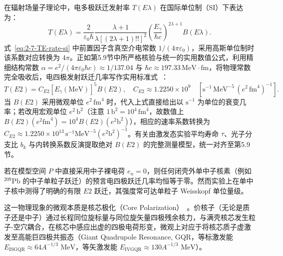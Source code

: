 在辐射场量子理论中，电多极跃迁发射率 $T(E\lambda)$ 在国际单位制（SI）下表达为：
\begin{equation}\label{eq:2-7-TE-rate-si}
T(E\lambda) = \frac{2}{\varepsilon_0 \hbar} \frac{\lambda + 1}{\lambda [(2\lambda + 1)!!]^2} \left(\frac{E_\gamma}{\hbar c}\right)^{2\lambda + 1} B(E\lambda).
\end{equation}
式~\eqref{eq:2-7-TE-rate-si} 中前置因子含真空介电常数 $1/(4\pi\varepsilon_0)$，采用高斯单位制时该系数对应转换为 $4\pi$。正如第5.9节中所严格核验与统一的实用数值公式，利用精细结构常数 $\alpha = e^2/(4\pi\varepsilon_0 \hbar c) \approx 1/137.04$ 与 $\hbar c \approx 197.33\,\mathrm{MeV}\cdot\mathrm{fm}$，将物理常数完全吸收后，电四极发射跃迁几率写作实用标准式~\cite{book-suhonen-from-nucleons-to-nucleus}：
\begin{equation}\label{eq:2-7-TE2-practical}
T(E2) = C_{E2} [E_\gamma(\mathrm{MeV})]^5 B(E2), \quad C_{E2} \approx 1.2250 \times 10^9 \quad [\mathrm{s}^{-1}\,\mathrm{MeV}^{-5}\,(e^2\,\mathrm{fm}^4)^{-1}].
\end{equation}
当 $B(E2)$ 采用微观单位 $e^2\,\mathrm{fm}^4$ 时，代入上式直接给出以 $\mathrm{s}^{-1}$ 为单位的衰变几率；若改用宏观单位 $e^2\,\mathrm{b}^2$（注意 $1\,\mathrm{b}^2 = 10^4\,\mathrm{fm}^4$，故数值上 $B(E2)(e^2\mathrm{fm}^4) = 10^4 B(E2)(e^2\mathrm{b}^2)$），相应的速率系数转换为 $C_{E2} \approx 1.2250 \times 10^{13}\,\mathrm{s}^{-1}\mathrm{MeV}^{-5}(e^2\mathrm{b}^2)^{-1}$。有关由激发态实验平均寿命 $\tau$、光子分支比 $b_k$ 与内转换系数反演提取绝对 $B(E2)$ 的完整测量模型，统一对齐至第5.9节。

若在模型空间 $P$ 中直接采用中子裸电荷 $e_n = 0$，则任何闭壳外单中子核素（例如 $^{209}\mathrm{Pb}$ 的中子单粒子跃迁）的预言电四极跃迁几率均恒等于零。然而实验上在单中子核中测得了明确的有限 $E2$ 跃迁，其强度常可达单粒子 Weisskopf 单位量级。

这一物理现象的微观本质是核芯极化（Core Polarization）~\cite{book-bohr-mottelson-nuclear-structure}。价核子（无论是质子还是中子）通过长程同位旋标量与同位旋矢量四极残余核力，与满壳核芯发生粒子-空穴耦合，在核芯中感应出虚的四极电荷形变，微观上对应于将核芯质子虚激发至高能巨四极共振态（Giant Quadrupole Resonance, GQR，等标激发能 $E_{\mathrm{ISGQR}} \approx 64 A^{-1/3}\text{ MeV}$，等矢激发能 $E_{\mathrm{IVGQR}} \approx 130 A^{-1/3}\text{ MeV}$）。


